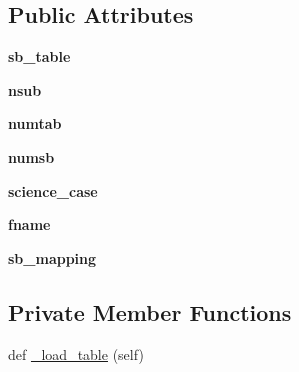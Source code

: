 \subsection*{Public Attributes}
\begin{DoxyCompactItemize}
\item 
\mbox{\label{classdarc_1_1sb__generator_1_1_s_b_generator_ad5ad747925c2ec431b4ee11b50f22364}} 
{\bfseries sb\+\_\+table}
\item 
\mbox{\label{classdarc_1_1sb__generator_1_1_s_b_generator_afe02d0f29233712c7aab77f6edda59f0}} 
{\bfseries nsub}
\item 
\mbox{\label{classdarc_1_1sb__generator_1_1_s_b_generator_a885efc4d674cb33722d1d7e65eaffa2a}} 
{\bfseries numtab}
\item 
\mbox{\label{classdarc_1_1sb__generator_1_1_s_b_generator_aa04833ab24411efdf9d7ff7318e9e975}} 
{\bfseries numsb}
\item 
\mbox{\label{classdarc_1_1sb__generator_1_1_s_b_generator_aa179e60a29ffb3b3ce2809255e58a512}} 
{\bfseries science\+\_\+case}
\item 
\mbox{\label{classdarc_1_1sb__generator_1_1_s_b_generator_a67f5d4d3289bcedb25911ad6b67f8a6b}} 
{\bfseries fname}
\item 
\mbox{\label{classdarc_1_1sb__generator_1_1_s_b_generator_a80c854447d05a8c975bd12d7035a6efc}} 
{\bfseries sb\+\_\+mapping}
\end{DoxyCompactItemize}
\subsection*{Private Member Functions}
\begin{DoxyCompactItemize}
\item 
def \mbox{\hyperlink{classdarc_1_1sb__generator_1_1_s_b_generator_ad9de3e5ab9bb3603a54a58b2c0f670bb}{\+\_\+load\+\_\+table}} (self)
\end{DoxyCompactItemize}
